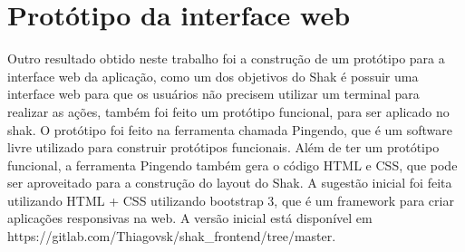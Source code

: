\section{Protótipo da interface web}

Outro resultado obtido neste trabalho foi a construção de um protótipo para a interface
web da aplicação, como um dos objetivos do Shak é possuir uma interface web para que
os usuários não precisem utilizar um terminal para realizar as ações, também foi
feito um protótipo funcional, para ser aplicado no shak. O protótipo foi feito
na ferramenta chamada Pingendo, que é um software livre utilizado para construir
protótipos funcionais. Além de ter um protótipo funcional, a ferramenta Pingendo
também gera o código HTML e CSS, que pode ser aproveitado para a construção
do layout do Shak. A sugestão inicial foi feita utilizando HTML + CSS utilizando
bootstrap 3, que é um framework para criar aplicações responsivas na web. A versão
inicial está disponível em https://gitlab.com/Thiagovsk/shak\_frontend/tree/master.


